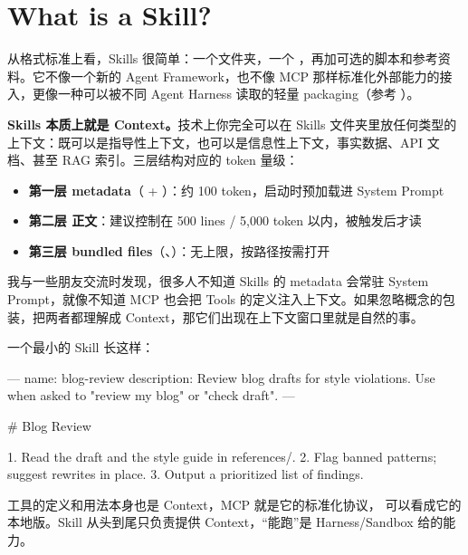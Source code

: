 \documentclass{onepoem}   %
\begin{document}
\makecover

\section{What is a Skill?}

从格式标准上看，Skills 很简单：一个文件夹，一个 ，再加可选的脚本和参考资料。它不像一个新的 Agent Framework，也不像 MCP 那样标准化外部能力的接入，更像一种可以被不同 Agent Harness 读取的轻量 packaging（参考 ）。

\textbf{Skills 本质上就是 Context。}技术上你完全可以在 Skills 文件夹里放任何类型的上下文：既可以是指导性上下文，也可以是信息性上下文，事实数据、API 文档、甚至 RAG 索引。三层结构对应的 token 量级：

\begin{itemize}
  \item \textbf{第一层 metadata}（ + ）：约 100 token，启动时预加载进 System Prompt
  \item \textbf{第二层  正文}：建议控制在 500 lines / 5,000 token 以内，被触发后才读
  \item \textbf{第三层 bundled files}（、）：无上限，按路径按需打开
\end{itemize}

\begin{tipbox}
我与一些朋友交流时发现，很多人不知道 Skills 的 metadata 会常驻 System Prompt，就像不知道 MCP 也会把 Tools 的定义注入上下文。如果忽略概念的包装，把两者都理解成 Context，那它们出现在上下文窗口里就是自然的事。
\end{tipbox}

一个最小的 Skill 长这样：

\begin{codeblock*}{}
---
name: blog-review
description: Review blog drafts for style violations.
  Use when asked to "review my blog" or "check draft".
---

# Blog Review

1. Read the draft and the style guide in references/.
2. Flag banned patterns; suggest rewrites in place.
3. Output a prioritized list of findings.
\end{codeblock*}

\begin{questionbox}
工具的定义和用法本身也是 Context，MCP 就是它的标准化协议， 可以看成它的本地版。Skill 从头到尾只负责提供 Context，``能跑''是 Harness/Sandbox 给的能力。
\end{questionbox}
\end{document}
